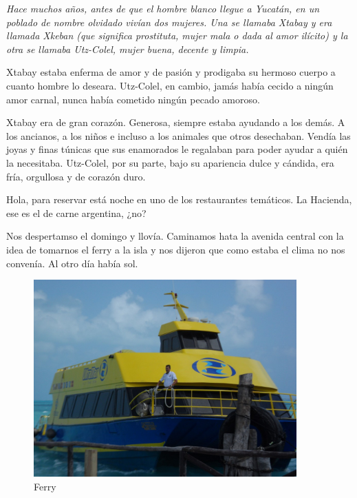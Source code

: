 \documentclass[11pt,twoside,openright,a6paper]{book}
\begin{document}
{\em Hace muchos años, antes de que el hombre blanco llegue a Yucatán,
en un poblado de nombre olvidado vivían dos mujeres. Una se llamaba Xtabay
y era llamada Xkeban (que significa prostituta, mujer mala o dada al amor
ilícito) y la otra se llamaba Utz-Colel, mujer buena, decente y limpia.

Xtabay estaba enferma de amor y de pasión y prodigaba su hermoso cuerpo
a cuanto hombre lo deseara. Utz-Colel, en cambio, jamás había cecido a
ningún amor carnal, nunca había cometido ningún pecado amoroso.

Xtabay era de gran corazón. Generosa, siempre estaba ayudando a los
demás. A los ancianos, a los niños e incluso a los animales que otros
desechaban. Vendía las joyas y finas túnicas que sus enamorados le regalaban
para poder ayudar a quién la necesitaba. Utz-Colel, por su parte, bajo su
apariencia dulce y cándida, era fría, orgullosa y de corazón duro.}


\vspace{0.5cm}
\hrulefill\hspace{0.2cm} \decofourleft\decofourright \hspace{0.2cm} \hrulefill
\vspace{0.5cm}

Hola, para reservar está noche en uno de los restaurantes temáticos. La
Hacienda, ese es el de carne argentina, ¿no?


\vspace{0.5cm}
\hrulefill\hspace{0.2cm} \decofourleft\decofourright \hspace{0.2cm} \hrulefill
\vspace{0.5cm}

Nos despertamso el domingo y llovía. Caminamos hata la avenida central
con la idea de tomarnos el ferry a la isla y nos dijeron que como estaba
el clima no nos convenía. Al otro día había sol.

\begin{figure}[H]
  \centering
    \includegraphics[width=0.9\textwidth]{fotos/2012/ferry}
  \caption{Ferry} \label{Ferry}
\end{figure}
\end{document}
